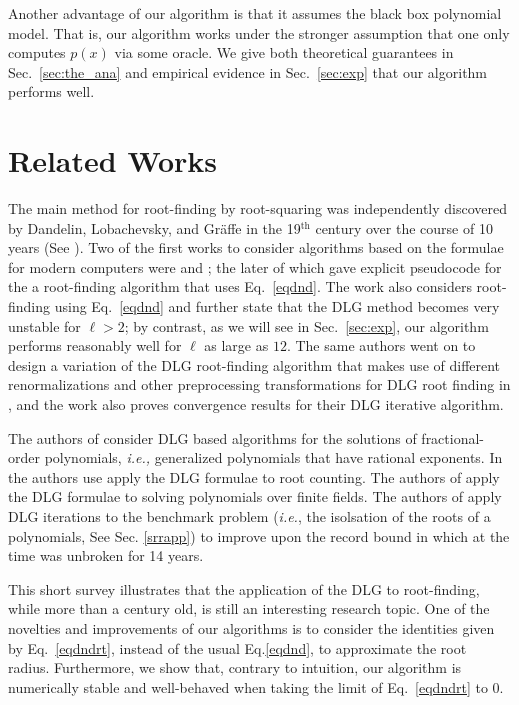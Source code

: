 \documentclass[runningheads]{llncs}
\begin{document}
Another advantage of our algorithm is that it assumes the black box polynomial model. That is, our algorithm works under the stronger assumption that one only computes $p(x)$ via some oracle. We give both theoretical guarantees in Sec.~\ref{sec:the_ana} and empirical evidence in Sec.~\ref{sec:exp} that our algorithm performs well.

\section{Related Works}
The main method for root-finding by root-squaring was independently discovered by Dandelin, Lobachevsky, and Gr{\"a}ffe in the 19$^\mathrm{th}$ century over the course of 10 years (See \cite{10.2307/2310626}). Two of the first works to consider algorithms based on the formulae for modern computers were \cite{10.1145/321186.321198} and \cite{10.1145/364955.364974}; the later of which gave explicit pseudocode for the a root-finding algorithm that uses Eq.~\ref{eqdnd}.
The work \cite{Malajovich2001OnTG} also considers root-finding using Eq.~\ref{eqdnd} and further state that the DLG method becomes very unstable for $\ell > 2$; by contrast, as we will see in Sec.~\ref{sec:exp}, our algorithm performs reasonably well for $\ell$ as large as $12$. The same authors went on to design a variation of the DLG root-finding algorithm that makes use of different renormalizations and other preprocessing transformations for DLG root finding in \cite{Malajovich2001TangentGI}, and the work also proves convergence results for their DLG iterative algorithm.

The authors of \cite{Bialas2010GeneralizationOV} consider DLG based algorithms for the solutions of fractional-order polynomials, \emph{i.e.,} generalized polynomials that have rational exponents. In \cite{Hoeven2011EfficientRC} the authors use apply the DLG formulae to root counting.
The authors of \cite{Grenet2015DeterministicRF} apply the DLG formulae to solving polynomials over finite fields. The authors of \cite{Becker2018ANS} apply DLG iterations to the benchmark problem (\emph{i.e.}, the isolsation of the roots of a polynomials, See Sec. \ref{srrapp}) to improve upon the record bound in \cite{pan2002univariate} which at the time was unbroken for 14 years.

This short survey illustrates that the application of the DLG to root-finding, while more than a century old, is still an interesting research topic. One of the novelties and improvements of our algorithms is to consider the identities given by Eq.~\ref{eqdndrt}, instead of the usual Eq.\ref{eqdnd}, to approximate the root radius. Furthermore, we show that, contrary to intuition, our algorithm is numerically stable and well-behaved when taking the limit of Eq.~\ref{eqdndrt} to 0.
\end{document}
